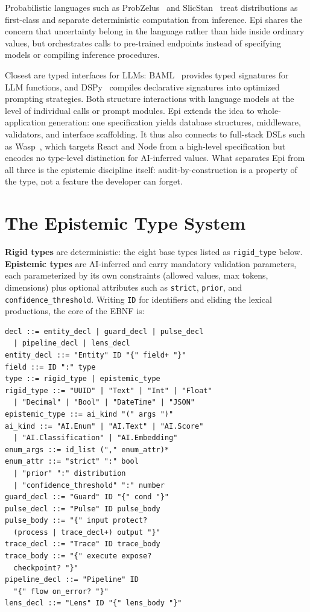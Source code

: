 \documentclass[sigconf]{acmart}
\begin{document}
Probabilistic languages such as ProbZelus~\cite{baudart2020} and SlicStan~\cite{gorinova2019} treat distributions as first-class and separate deterministic computation from inference. Epi shares the concern that uncertainty belong in the language rather than hide inside ordinary values, but orchestrates calls to pre-trained endpoints instead of specifying models or compiling inference procedures.

Closest are typed interfaces for LLMs: BAML~\cite{baml} provides typed signatures for LLM functions, and DSPy~\cite{khattab2023dspy} compiles declarative signatures into optimized prompting strategies. Both structure interactions with language models at the level of individual calls or prompt modules. Epi extends the idea to whole-application generation: one specification yields database structures, middleware, validators, and interface scaffolding. It thus also connects to full-stack DSLs such as Wasp~\cite{wasp}, which targets React and Node from a high-level specification but encodes no type-level distinction for AI-inferred values. What separates Epi from all three is the epistemic discipline itself: audit-by-construction is a property of the type, not a feature the developer can forget.

\section{The Epistemic Type System}
\label{sec:type-system}

\textbf{Rigid types} are deterministic: the eight base types listed as \texttt{rigid\_type} below. \textbf{Epistemic types} are AI-inferred and carry mandatory validation parameters, each parameterized by its own constraints (allowed values, max tokens, dimensions) plus optional attributes such as \texttt{strict}, \texttt{prior}, and \texttt{confidence\_\allowbreak{}threshold}. Writing \texttt{ID} for identifiers and eliding the lexical productions, the core of the EBNF is:

\begin{verbatim}
decl ::= entity_decl | guard_decl | pulse_decl
  | pipeline_decl | lens_decl
entity_decl ::= "Entity" ID "{" field+ "}"
field ::= ID ":" type
type ::= rigid_type | epistemic_type
rigid_type ::= "UUID" | "Text" | "Int" | "Float"
  | "Decimal" | "Bool" | "DateTime" | "JSON"
epistemic_type ::= ai_kind "(" args ")"
ai_kind ::= "AI.Enum" | "AI.Text" | "AI.Score"
  | "AI.Classification" | "AI.Embedding"
enum_args ::= id_list ("," enum_attr)*
enum_attr ::= "strict" ":" bool
  | "prior" ":" distribution
  | "confidence_threshold" ":" number
guard_decl ::= "Guard" ID "{" cond "}"
pulse_decl ::= "Pulse" ID pulse_body
pulse_body ::= "{" input protect?
  (process | trace_decl+) output "}"
trace_decl ::= "Trace" ID trace_body
trace_body ::= "{" execute expose?
  checkpoint? "}"
pipeline_decl ::= "Pipeline" ID
  "{" flow on_error? "}"
lens_decl ::= "Lens" ID "{" lens_body "}"
\end{verbatim}
\end{document}
